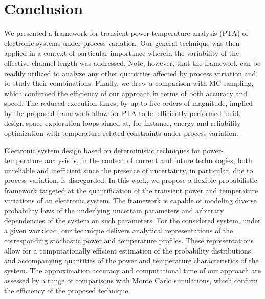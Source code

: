 \section{Conclusion}

We presented a framework for transient power-temperature analysis (PTA) of
electronic systems under process variation. Our general technique was then
applied in a context of particular importance wherein the variability of the
effective channel length was addressed. Note, however, that the framework can be
readily utilized to analyze any other quantities affected by process variation
and to study their combinations. Finally, we drew a comparison with MC sampling,
which confirmed the efficiency of our approach in terms of both accuracy and
speed. The reduced execution times, by up to five orders of magnitude, implied
by the proposed framework allow for PTA to be efficiently performed inside
design space exploration loops aimed at, for instance, energy and reliability
optimization with temperature-related constraints under process variation.

Electronic system design based on deterministic techniques for power-temperature
analysis is, in the context of current and future technologies, both unreliable
and inefficient since the presence of uncertainty, in particular, due to process
variation, is disregarded. In this work, we propose a flexible probabilistic
framework targeted at the quantification of the transient power and temperature
variations of an electronic system. The framework is capable of modeling diverse
probability laws of the underlying uncertain parameters and arbitrary
dependencies of the system on such parameters. For the considered system, under
a given workload, our technique delivers analytical representations of the
corresponding stochastic power and temperature profiles. These representations
allow for a computationally efficient estimation of the probability
distributions and accompanying quantities of the power and temperature
characteristics of the system. The approximation accuracy and computational time
of our approach are assessed by a range of comparisons with Monte Carlo
simulations, which confirm the efficiency of the proposed technique.
